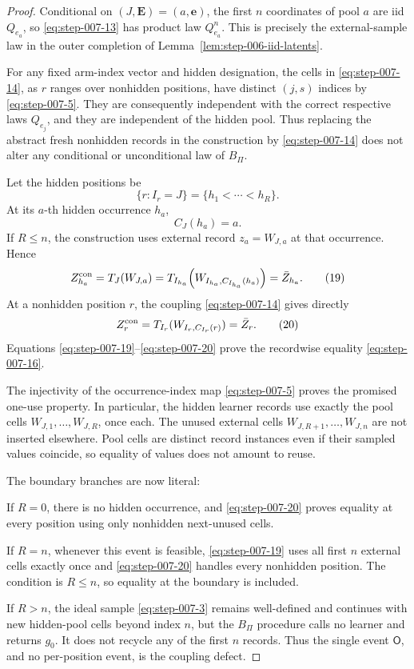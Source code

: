 \begin{proof}

Conditional on \((J,\mathbf E)=(a,\mathbf e)\), the first \(n\)
coordinates of pool \(a\) are iid \(Q_{e_a}\), so \eqref{eq:step-007-13} has product law
\(Q_{e_a}^n\).  This is precisely the external-sample law in the outer
completion of Lemma~\ref{lem:step-006-iid-latents}.

For any fixed arm-index vector and hidden designation, the cells in
\eqref{eq:step-007-14}, as \(r\) ranges over nonhidden positions, have distinct
\((j,s)\) indices by \eqref{eq:step-007-5}.  They are consequently independent with the
correct respective laws \(Q_{e_j}\), and they are independent of the
hidden pool.  Thus replacing the abstract fresh nonhidden records in
the construction by \eqref{eq:step-007-14} does not alter any conditional or
unconditional law of \(B_\Pi\).

Let the hidden positions be
\[
\{r:I_r=J\}=\{h_1<\cdots<h_R\}.
\tag{17}\label{eq:step-007-17}
\]
At its \(a\)-th hidden occurrence \(h_a\),
\[
C_J(h_a)=a.
\tag{18}\label{eq:step-007-18}
\]
If \(R\le n\), the construction uses external record
\(z_a=W_{J,a}\) at that occurrence.  Hence
\[
Z^{\rm con}_{h_a}
=T_J(W_{J,a})
=T_{I_{h_a}}\!\left(
W_{I_{h_a},C_{I_{h_a}}(h_a)}
\right)
=\bar Z_{h_a}.
\tag{19}\label{eq:step-007-19}
\]
At a nonhidden position \(r\), the coupling \eqref{eq:step-007-14} gives directly
\[
Z^{\rm con}_r
=T_{I_r}(W_{I_r,C_{I_r}(r)})
=\bar Z_r.
\tag{20}\label{eq:step-007-20}
\]
Equations \eqref{eq:step-007-19}--\eqref{eq:step-007-20} prove the recordwise equality \eqref{eq:step-007-16}.

The injectivity of the occurrence-index map \eqref{eq:step-007-5} proves the promised
one-use property.  In particular, the hidden learner records use
exactly the pool cells \(W_{J,1},\ldots,W_{J,R}\), once each.  The
unused external cells \(W_{J,R+1},\ldots,W_{J,n}\) are not inserted
elsewhere.  Pool cells are distinct record instances even if their
sampled values coincide, so equality of values does not amount to
reuse.

The boundary branches are now literal:

\par\noindent If \(R=0\), there is no hidden occurrence, and \eqref{eq:step-007-20} proves equality
  at every position using only nonhidden next-unused cells.
\par\noindent If \(R=n\), whenever this event is feasible, \eqref{eq:step-007-19} uses all first
  \(n\) external cells exactly once and \eqref{eq:step-007-20} handles every nonhidden
  position.  The condition is \(R\le n\), so equality at the
  boundary is included.
\par\noindent If \(R>n\), the ideal sample \eqref{eq:step-007-3} remains well-defined and continues
  with new hidden-pool cells beyond index \(n\), but the 
  \(B_\Pi\) procedure calls no learner and returns \(g_0\).  It does
  not recycle any of the first \(n\) records.  Thus the single event
  \(\mathsf O\), and no per-position event, is the coupling defect.


\end{proof}
